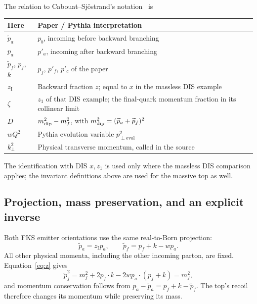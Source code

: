 \documentclass[11pt,a4paper]{article}
\newcommand{\zI}{z_{\mathrm{I}}}
\newcommand{\kt}{k_{\perp}}
\newcommand{\code}[1]{\texttt{\detokenize{#1}}}
\begin{document}
The relation to Cabouat--Sj\"ostrand's notation~\cite{Cabouat} is
\begin{center}\small
\begin{tabularx}{\linewidth}{@{}lX@{}}
\toprule
Here & Paper / Pythia interpretation\\
\midrule
$\widetilde p_a$ & $p_b$, incoming before backward branching\\
$p_a$ & $p'_a$, incoming after backward branching\\
$\widetilde p_f$, $p_f$, $k$ & $p_f$, $p'_f$, $p'_c$ of the paper\\
$\zI$ & Backward fraction $z$; equal to $x$ in the massless DIS example\\
$\zeta$ & $z_1$ of that DIS example; the final-quark momentum fraction in its collinear limit\\
$D$ & $m_{\rm dip}^2-m_f^2$, with $m_{\rm dip}^2=(\widetilde p_a+\widetilde p_f)^2$\\
$wQ^2$ & Pythia evolution variable $p_{\perp\mathrm{evol}}^2$\\
$\kt^2$ & Physical transverse momentum, called \code{pT2corr} in the source\\
\bottomrule
\end{tabularx}
\end{center}
The identification with DIS $x,z_1$ is used only where the massless DIS
comparison applies; the invariant definitions above are used for the massive
top as well.

\subsection{Projection, mass preservation, and an explicit inverse}

Both FKS emitter orientations use the same real-to-Born projection:
\begin{equation}
 \boxed{\widetilde p_a=\zI p_a,\qquad
 \widetilde p_f=p_f+k-wp_a.}\label{eq:projection}
\end{equation}
All other physical momenta, including the other incoming parton, are fixed.
Equation~\eqref{eq:z} gives
\begin{equation}
 \widetilde p_f^2=m_f^2+2p_f\cdot k
             -2w p_a\cdot(p_f+k)=m_f^2,
\end{equation}
and momentum conservation follows from
$p_a-\widetilde p_a=p_f+k-\widetilde p_f$.
The top's recoil therefore changes its momentum while preserving its mass.
\end{document}
